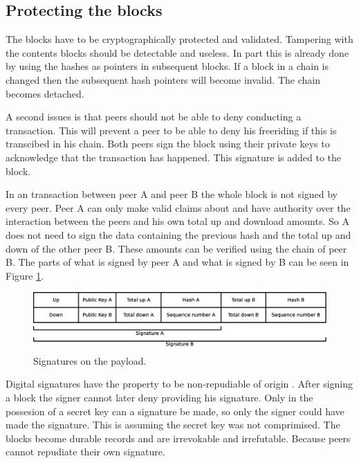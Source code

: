 \subsection{Protecting the blocks}
\label{sect:repudiation}
The blocks have to be cryptographically protected and validated.
Tampering with the contents blocks should be detectable and useless.
In part this is already done by using the hashes as pointers in subsequent blocks.
If a block in a chain is changed then the subsequent hash pointers will become invalid.
The chain becomes detached.

A second issues is that peers should not be able to deny conducting a transaction.
This will prevent a peer to be able to deny his freeriding if this is transcibed in his chain.
Both peers sign the block using their private keys to acknowledge that the transaction has happened.
This signature is added to the block.

In an transaction between peer A and peer B the whole block is not signed by every peer.
Peer A can only make valid claims about and have authority over the interaction between the peers
and his own total up and download amounts.
So A does not need to sign the data containing the previous hash and the total up and down of the other peer B.
These amounts can be verified using the chain of peer B.
The parts of what is signed by peer A and what is signed by B can be seen in Figure \ref{fig:signatures}.
\begin{figure}
	\centerline{\includegraphics[scale=0.3]{design/figs/signatures.eps}}
	\caption{Signatures on the payload.}
	\label{fig:signatures}
\end{figure}

Digital signatures have the property to be non-repudiable of origin \cite{VanderLubbe-crypto}.
After signing a block the signer cannot later deny providing his signature.
Only in the possesion of a secret key can a signature be made,
so only the signer could have made the signature.
This is assuming the secret key was not comprimised.
The blocks become durable records and are irrevokable and irrefutable.
Because peers cannot repudiate their own signature.

